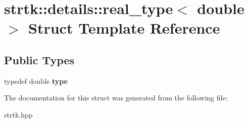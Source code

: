 \hypertarget{structstrtk_1_1details_1_1real__type_3_01double_01_4}{\section{strtk\-:\-:details\-:\-:real\-\_\-type$<$ double $>$ Struct Template Reference}
\label{structstrtk_1_1details_1_1real__type_3_01double_01_4}
}
\subsection*{Public Types}
\begin{DoxyCompactItemize}
\item 
\hypertarget{structstrtk_1_1details_1_1real__type_3_01double_01_4_a1802b336e2049fca08d2b398802765d3}{typedef double {\bfseries type}}\label{structstrtk_1_1details_1_1real__type_3_01double_01_4_a1802b336e2049fca08d2b398802765d3}

\end{DoxyCompactItemize}


The documentation for this struct was generated from the following file\-:\begin{DoxyCompactItemize}
\item 
strtk.\-hpp\end{DoxyCompactItemize}
